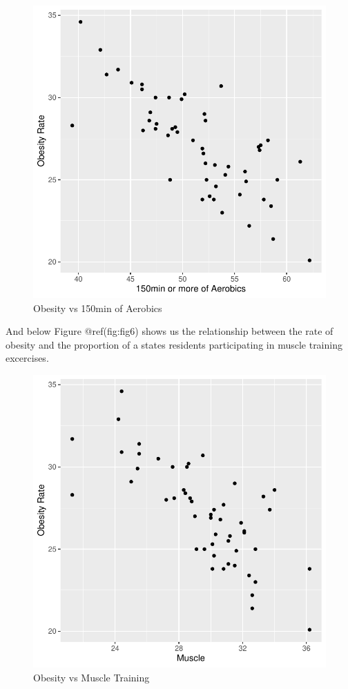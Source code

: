 \documentclass[
]{article}
\begin{document}
\begin{figure}
\centering
\includegraphics{paper_files/figure-latex/fig5-1.pdf}
\caption{Obesity vs 150min of Aerobics}
\end{figure}

And below Figure @ref(fig:fig6) shows us the relationship between the
rate of obesity and the proportion of a states residents participating
in muscle training excercises.

\begin{figure}
\centering
\includegraphics{paper_files/figure-latex/fig6-1.pdf}
\caption{Obesity vs Muscle Training}
\end{figure}
\end{document}
